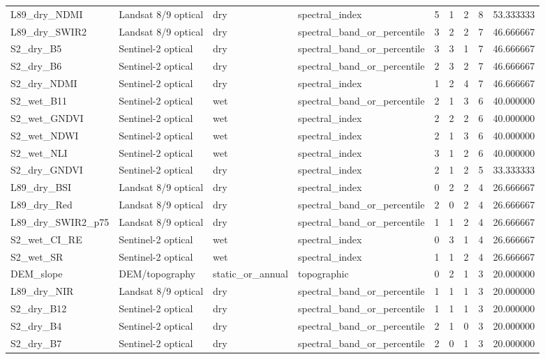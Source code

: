 \begin{tabular}{llllrrrrr}
L89_dry_NDMI & Landsat 8/9 optical & dry & spectral_index & 5 & 1 & 2 & 8 & 53.333333 \\
L89_dry_SWIR2 & Landsat 8/9 optical & dry & spectral_band_or_percentile & 3 & 2 & 2 & 7 & 46.666667 \\
S2_dry_B5 & Sentinel-2 optical & dry & spectral_band_or_percentile & 3 & 3 & 1 & 7 & 46.666667 \\
S2_dry_B6 & Sentinel-2 optical & dry & spectral_band_or_percentile & 2 & 3 & 2 & 7 & 46.666667 \\
S2_dry_NDMI & Sentinel-2 optical & dry & spectral_index & 1 & 2 & 4 & 7 & 46.666667 \\
S2_wet_B11 & Sentinel-2 optical & wet & spectral_band_or_percentile & 2 & 1 & 3 & 6 & 40.000000 \\
S2_wet_GNDVI & Sentinel-2 optical & wet & spectral_index & 2 & 2 & 2 & 6 & 40.000000 \\
S2_wet_NDWI & Sentinel-2 optical & wet & spectral_index & 2 & 1 & 3 & 6 & 40.000000 \\
S2_wet_NLI & Sentinel-2 optical & wet & spectral_index & 3 & 1 & 2 & 6 & 40.000000 \\
S2_dry_GNDVI & Sentinel-2 optical & dry & spectral_index & 2 & 1 & 2 & 5 & 33.333333 \\
L89_dry_BSI & Landsat 8/9 optical & dry & spectral_index & 0 & 2 & 2 & 4 & 26.666667 \\
L89_dry_Red & Landsat 8/9 optical & dry & spectral_band_or_percentile & 2 & 0 & 2 & 4 & 26.666667 \\
L89_dry_SWIR2_p75 & Landsat 8/9 optical & dry & spectral_band_or_percentile & 1 & 1 & 2 & 4 & 26.666667 \\
S2_wet_CI_RE & Sentinel-2 optical & wet & spectral_index & 0 & 3 & 1 & 4 & 26.666667 \\
S2_wet_SR & Sentinel-2 optical & wet & spectral_index & 1 & 1 & 2 & 4 & 26.666667 \\
DEM_slope & DEM/topography & static_or_annual & topographic & 0 & 2 & 1 & 3 & 20.000000 \\
L89_dry_NIR & Landsat 8/9 optical & dry & spectral_band_or_percentile & 1 & 1 & 1 & 3 & 20.000000 \\
S2_dry_B12 & Sentinel-2 optical & dry & spectral_band_or_percentile & 1 & 1 & 1 & 3 & 20.000000 \\
S2_dry_B4 & Sentinel-2 optical & dry & spectral_band_or_percentile & 2 & 1 & 0 & 3 & 20.000000 \\
S2_dry_B7 & Sentinel-2 optical & dry & spectral_band_or_percentile & 2 & 0 & 1 & 3 & 20.000000 \\

\end{tabular}
